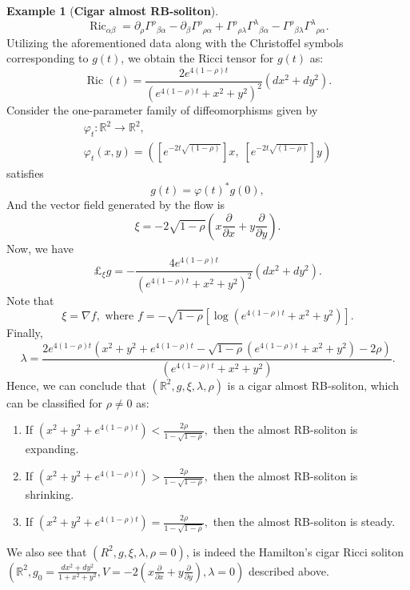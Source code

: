 \documentclass[a4paper, twoside, 10pt]{article}
\numberwithin{equation}{section}
\theoremstyle{definition}
\newtheorem{example}{Example}[section]
\begin{document}
\begin{example}[{\bf Cigar almost RB-soliton}]
\[
\operatorname{Ric}_{\alpha \beta}=\partial_\rho \Gamma^\rho{ }_{\beta \alpha}-\partial_\beta \Gamma^\rho{ }_{\rho \alpha}+\Gamma^\rho{ }_{\rho \lambda} \Gamma^\lambda{ }_{\beta \alpha}-\Gamma^\rho{ }_{\beta \lambda} \Gamma^\lambda{ }_{\rho \alpha}.
\]
Utilizing the aforementioned data along with the Christoffel symbols corresponding to 
$g(t)$, we obtain the Ricci tensor for $g(t)$ as:
\begin{equation}
\operatorname{Ric}(t)=\frac{2 e^{4(1-\rho) t}}{\left(e^{4(1-\rho) t}+x^2+y^2\right)^2}\left(d x^2+d y^2\right) .
\end{equation}
Consider the one-parameter family of diffeomorphisms given by
$$
\begin{gathered}
\varphi_t: \mathbb{R}^2 \longrightarrow \mathbb{R}^2, \\
\varphi_t(x, y)=\left([e^{-2t\sqrt{(1-\rho)}}] x, \; [e^{-2t\sqrt{(1-\rho)} }] y\right)
\end{gathered}
$$
satisfies
$$g(t)=\varphi(t)^\ast g(0),$$
And the vector field generated by the flow is 
\begin{equation}
    \xi=-2\sqrt{1-\rho}\left(x\frac{\partial}{\partial x}+y\frac{\partial}{\partial y}\right).
\end{equation}
Now, we have 
\begin{equation}
    \pounds_\xi g=- \frac{4 e^{4(1-\rho) t}}{\left(e^{4(1-\rho) t}+x^2+y^2\right)^2}\left(d x^2+d y^2\right). 
\end{equation}
Note that
\begin{equation}
\xi = \nabla f, \mbox{  where } f = -\sqrt{1-\rho}\left[\log\left(e^{4(1-\rho) t}+x^2+y^2\right)\right].
\end{equation}
Finally,
\begin{equation}
    \lambda=\frac{2 e^{4(1-\rho) t}\left(x^2+y^2+e^{4(1-\rho) t}-\sqrt{1-\rho}(e^{4(1-\rho) t}+x^2+y^2)-2\rho\right)}{\left(e^{4(1-\rho) t}+x^2+y^2\right)}.
\end{equation}
Hence, we can conclude that $(\mathbb{R}^2,g,\xi,\lambda,\rho)$ is a cigar almost RB-soliton, which can be classified for $\rho \neq 0$ as: 

\begin{enumerate}
    \item If $(x^2+y^2+e^{4(1-\rho) t})<\frac{2\rho}{1-\sqrt{1-\rho}},$ then the almost RB-soliton is expanding.
    \item If $(x^2+y^2+e^{4(1-\rho) t})>\frac{2\rho}{1-\sqrt{1-\rho}},$ then the almost RB-soliton is shrinking.
    \item If $(x^2+y^2+e^{4(1-\rho) t})=\frac{2\rho}{1-\sqrt{1-\rho}},$ then the almost  RB-soliton is steady.
\end{enumerate}
We also see that  $({R}^2,g,\xi,\lambda,\rho = 0)$, is indeed the Hamilton's cigar Ricci soliton $\left({\mathbb{R}^2}, g_0 = \frac{dx^2+dy^2}{1+x^2+y^2}, V = - 2\left(x\frac{\partial}{\partial x}+y\frac{\partial}{\partial y} \right), \lambda=0 \right)$
described above.
\end{example}
\end{document}
